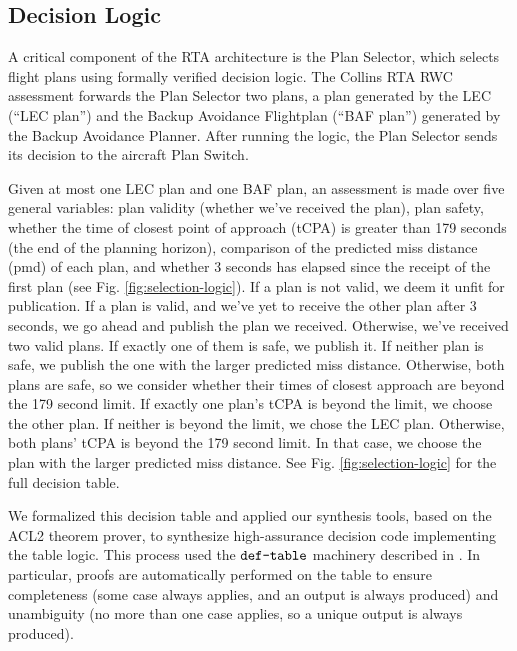 \subsection{Decision Logic}




A critical component of the RTA architecture is the Plan Selector, which selects flight
plans using formally verified decision logic. The Collins RTA RWC assessment
forwards the Plan Selector two plans, a plan generated by the LEC (``LEC plan'') and
the Backup Avoidance Flightplan (``BAF plan'') generated by the Backup Avoidance
Planner. After running the logic, the Plan Selector sends its decision to the
aircraft Plan Switch.

Given at most one LEC plan and one BAF plan, an assessment is made over five
general variables: plan validity (whether we've received the plan), plan
safety, whether the time of closest point of approach (tCPA) is greater than
179 seconds (the end of the planning horizon), comparison of the predicted miss
distance (pmd) of each plan, and whether 3 seconds has elapsed since the
receipt of the first plan (see Fig. \ref{fig:selection-logic}). If a plan is
not valid, we deem it unfit for publication.  If a plan is valid, and we've yet
to receive the other plan after 3 seconds, we go ahead and publish the plan we
received.  Otherwise, we've received two valid plans.  If exactly one of them
is safe, we publish it.  If neither plan is safe, we publish the one with the
larger predicted miss distance.  Otherwise, both plans are safe, so we consider
whether their times of closest approach are beyond the 179 second limit.  If
exactly one plan's tCPA is beyond the limit, we choose the other plan.  If
neither is beyond the limit, we chose the LEC plan.  Otherwise, both plans'
tCPA is beyond the 179 second limit.  In that case, we choose the plan with the
larger predicted miss distance.  See Fig. \ref{fig:selection-logic} for the
full decision table.

We formalized this decision table and applied our synthesis tools, based on the
ACL2 theorem prover\cite{acl2}, to synthesize high-assurance decision code
implementing the table logic.  This process used the $\verb+def-table+$
machinery described in \cite{dasc2020}.  In particular, proofs are
automatically performed on the table to ensure completeness (some case always
applies, and an output is always produced) and unambiguity (no more than one
case applies, so a unique output is always produced).

